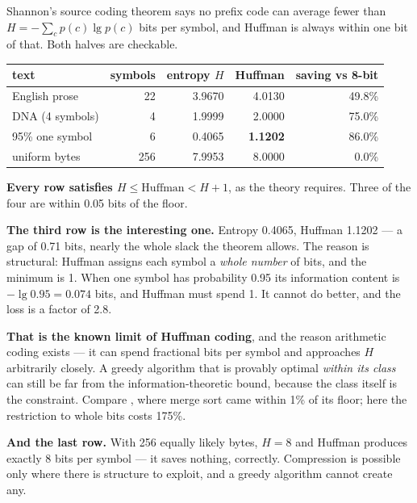 \begin{worked}
Shannon's source coding theorem says no prefix code can average fewer than
$H = -\sum_{c} p(c)\lg p(c)$ bits per symbol, and Huffman is always within one
bit of that. Both halves are checkable.

\begin{center}
\begin{tabular}{@{}lrrrr@{}}
\toprule
\rowcolor{primary!15}
text & symbols & entropy $H$ & Huffman & saving vs 8-bit \\
\midrule
English prose     &  22 & 3.9670 & 4.0130 & 49.8\% \\
DNA (4 symbols)   &   4 & 1.9999 & 2.0000 & 75.0\% \\
95\% one symbol   &   6 & 0.4065 & \textbf{1.1202} & 86.0\% \\
uniform bytes     & 256 & 7.9953 & 8.0000 &  0.0\% \\
\bottomrule
\end{tabular}
\end{center}

\smallskip
\textbf{Every row satisfies $H \le \text{Huffman} < H+1$}, as the theory
requires. Three of the four are within 0.05 bits of the floor.

\smallskip
\textbf{The third row is the interesting one.} Entropy 0.4065, Huffman 1.1202
--- a gap of 0.71 bits, nearly the whole slack the theorem allows. The reason
is structural: Huffman assigns each symbol a \emph{whole number} of bits, and
the minimum is 1. When one symbol has probability 0.95 its information content
is $-\lg 0.95 = 0.074$ bits, and Huffman must spend 1. It cannot do better,
and the loss is a factor of 2.8.

\smallskip
\textbf{That is the known limit of Huffman coding}, and the reason arithmetic
coding exists --- it can spend fractional bits per symbol and approaches $H$
arbitrarily closely. A greedy algorithm that is provably optimal \emph{within
its class} can still be far from the information-theoretic bound, because the
class itself is the constraint. Compare , where merge sort
came within 1\% of its floor; here the restriction to whole bits costs 175\%.

\smallskip
\textbf{And the last row.} With 256 equally likely bytes, $H = 8$ and Huffman
produces exactly 8 bits per symbol --- it saves nothing, correctly. Compression
is possible only where there is structure to exploit, and a greedy algorithm
cannot create any.
\end{worked}

